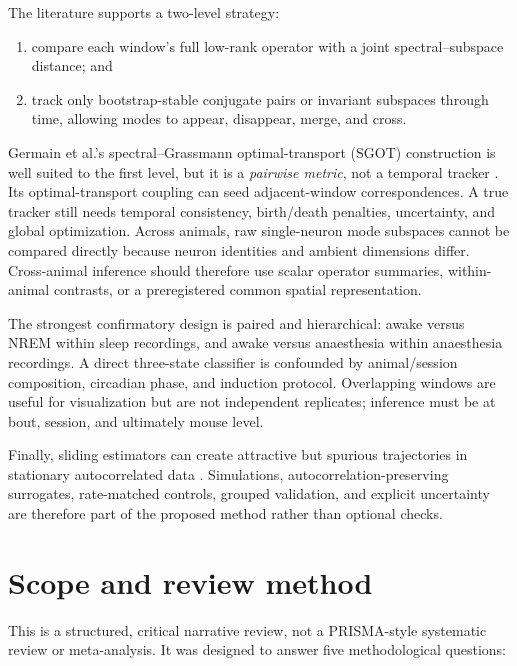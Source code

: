 \documentclass[11pt,a4paper]{article}
\begin{document}
The literature supports a two-level strategy:

\begin{enumerate}
  \item compare each window's full low-rank operator with a joint spectral--subspace distance; and
  \item track only bootstrap-stable conjugate pairs or invariant subspaces through time, allowing modes to appear, disappear, merge, and cross.
\end{enumerate}

Germain et al.'s spectral--Grassmann optimal-transport (SGOT) construction is well suited to the first level, but it is a \emph{pairwise metric}, not a temporal tracker \citep{germain2026}. Its optimal-transport coupling can seed adjacent-window correspondences. A true tracker still needs temporal consistency, birth/death penalties, uncertainty, and global optimization. Across animals, raw single-neuron mode subspaces cannot be compared directly because neuron identities and ambient dimensions differ. Cross-animal inference should therefore use scalar operator summaries, within-animal contrasts, or a preregistered common spatial representation.

The strongest confirmatory design is paired and hierarchical: awake versus NREM within sleep recordings, and awake versus anaesthesia within anaesthesia recordings. A direct three-state classifier is confounded by animal/session composition, circadian phase, and induction protocol. Overlapping windows are useful for visualization but are not independent replicates; inference must be at bout, session, and ultimately mouse level.

Finally, sliding estimators can create attractive but spurious trajectories in stationary autocorrelated data \citep{leonardi2015,hindriks2016}. Simulations, autocorrelation-preserving surrogates, rate-matched controls, grouped validation, and explicit uncertainty are therefore part of the proposed method rather than optional checks.

\section{Scope and review method}

This is a structured, critical narrative review, not a PRISMA-style systematic review or meta-analysis. It was designed to answer five methodological questions:
\end{document}
